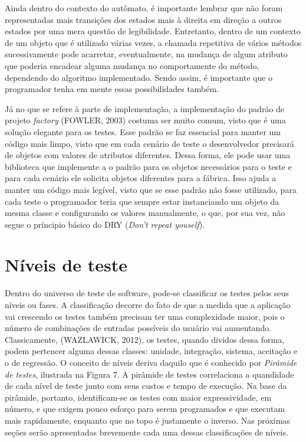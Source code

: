 \documentclass[
    12pt,       %
    openright,      %
    twoside,      %
    a4paper,      %
    english,      %
    french,       %
    spanish,      %
    brazil,       %
    ]{abntex2}
\begin{document}
          Ainda dentro do contexto do autômato, é importante lembrar que não foram representadas
          mais transições dos estados mais à direita em direção a outros estados por uma mera
          questão de legibilidade. Entretanto, dentro de um contexto de um objeto que é utilizado
          várias vezes, a chamada repetitiva de vários métodos sucessivamente pode acarretar,
          eventualmente, na mudança de algum atributo que poderia encadear alguma mudança no
          comportamente do método, dependendo do algoritmo implementado. Sendo assim, é importante
          que o programador tenha em mente essas possibilidades também.

          Já no que se refere à parte de implementação, a implementação do padrão de projeto
          \textit{factory} (FOWLER, 2003) costuma ser muito comum, visto que é uma solução elegante
          para os testes. Esse padrão se faz essencial para manter um código mais limpo,
          visto que em cada cenário de teste o desenvolvedor precisará de objetos com valores de
          atributos diferentes. Dessa forma, ele pode usar uma biblioteca que implemente a
          o padrão para os objetos necessários para o teste e para cada cenário ele solicita
          objetos diferentes para a fábrica. Isso ajuda a manter um código mais legível, visto
          que se esse padrão não fosse utilizado, para cada teste o programador teria que sempre
          estar instanciando um objeto da mesma classe e configurando os valores manualmente,
          o que, por sua vez, não segue o príncipio básico do DRY (\textit{Don't repeat youself}).

      \section{Níveis de teste}
          Dentro do universo de teste de software, pode-se classificar os testes pelos seus
          níveis ou fases. A classificação decorre do fato de que a medida que a aplicação
          vai crescendo os testes também precisam ter uma complexidade maior, pois o número
          de combinações de entradas possíveis do usuário vai aumentando. Classicamente,
          (WAZLAWICK, 2012), os testes, quando dividos dessa forma, podem pertencer alguma
          dessas classes: unidade, integração, sistema, aceitação e o de regressão. O
          conceito de níveis deriva daquilo que é conhecido por \textit{Pirâmide de testes},
          ilustrada na Figura 7. A pirâmide de testes correlaciona a quandidade de cada nível
          de teste junto com seus custos e tempo de execução. Na base da pirâmide, portanto,
          identificam-se os testes com maior expressividade, em número, e que exigem pouco
          esforço para serem programados e que executam mais rapidamente, enquanto que no topo
          é justamente o inverso. Nas próximas seções serão apresentadas brevemente cada
          uma dessas classificações de níveis.
\end{document}
